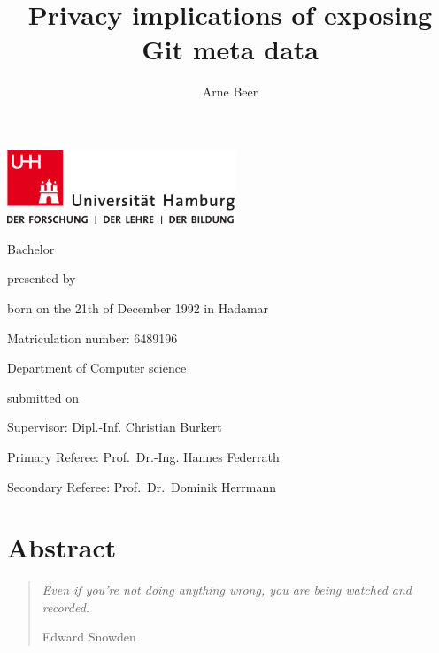 \documentclass{thesis}
\title{Privacy implications of exposing Git meta data}
\author{Arne Beer}
\begin{document}
\begin{titlepage}
    \includegraphics[width=6.8cm]{./pic/up-uhh-logo-u-2010-u-farbe-u-rgb.pdf}
    \begin{center}\Large
        \vfill
        Bachelor
        \vfill

        \makeatletter
        {\Large\textsf{\textbf{\@title}}\par}
        \makeatother

        \vfill
        presented by
        \par\bigskip

        \makeatletter
        {\@author} \par
        \makeatother

        born on the 21th of December 1992 in Hadamar \par
        Matriculation number: 6489196 \par
        Department of Computer science
        \vfill

        \makeatletter
        submitted on {\@date}
        \makeatother

        \vfill
        Supervisor: Dipl.-Inf. Christian Burkert \par
        Primary Referee: Prof.\ Dr.-Ing. Hannes Federrath \par
        Secondary Referee: Prof.\ Dr.\ Dominik Herrmann

    \end{center}
\end{titlepage}

\cleardoublepage{}

\chapter*{Abstract}
\onehalfspace{}


\singlespace{}

\clearpage
\vspace*{\fill}
\thispagestyle{empty} %
\begin{quotation}
    \em
    Even if you're not doing anything wrong, you are being watched and recorded.

    \medskip
\raggedleft{}
    Edward Snowden
\end{quotation}
\vspace*{\fill}
\end{document}
